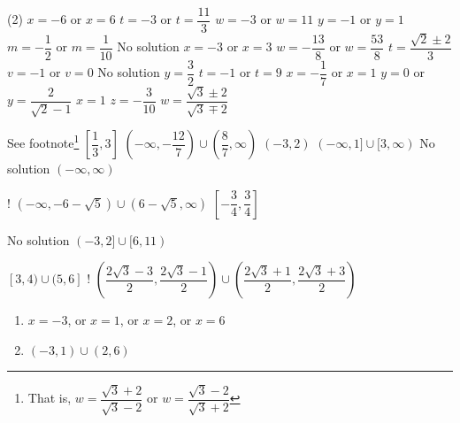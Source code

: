 \begin{tasks}(2)
\task  $x = -6$ or $x=6$ 
\task $t = -3$ or $t= \dfrac{11}{3}$
\task $w = -3$ or $w= 11$ 
\task  $y = -1$ or $y= 1$
\task $m=-\dfrac{1}{2}$ or $m= \dfrac{1}{10}$
\task No solution
\task  $x=-3$ or $x= 3$
\task $w = -\dfrac{13}{8}$ or $w= \dfrac{53}{8}$
\task $t = \dfrac{\sqrt{2} \pm 2}{3}$
\task $v = -1$ or $v = 0$ 
\task  No solution
\task  $y = \dfrac{3}{2}$
\task $t = -1$ or $t = 9$
\task $x = -\dfrac{1}{7}$ or $x = 1$
\task $y = 0$ or $y = \dfrac{2}{\sqrt{2} - 1}$ 
\task $x=1$
\task $z = -\dfrac{3}{10}$
\task $w = \dfrac{\sqrt{3} \pm 2}{\sqrt{3} \mp 2}$ 

See footnote\footnote{That is, $w = \dfrac{\sqrt{3} + 2}{\sqrt{3} - 2}$ or $w = \dfrac{\sqrt{3} - 2}{\sqrt{3} + 2}$} 
\task $\left[\dfrac{1}{3}, 3\right]$  
\task $\left(-\infty, -\dfrac{12}{7} \right) \cup \left(\dfrac{8}{7}, \infty\right)$
\task $(-3,2)$  
\task $(-\infty,1] \cup [3,\infty)$
\task No solution  
\task $(-\infty, \infty)$

\task! $(-\infty, -6-\sqrt{5}) \cup (6-\sqrt{5}, \infty)$ 
\task $\left[ -\dfrac{3}{4}, \dfrac{3}{4}\right]$   

\task No solution 
\task $(-3,2] \cup [6,11)$

\task $[3, 4) \cup (5, 6]$
\task! $\left(\dfrac{2 \sqrt{3} - 3}{2},  \dfrac{2 \sqrt{3} - 1}{2}   \right) \cup \left(\dfrac{2 \sqrt{3} +1}{2},  \dfrac{2 \sqrt{3} +3}{2}   \right)$

\task 
\begin{enumerate}[label=(\alph*)]
    \item $x = -3$, or $x = 1$, or $x = 2$, or $x = 6$
    \item $(-3,1) \cup (2,6)$
\end{enumerate}
\end{tasks}
